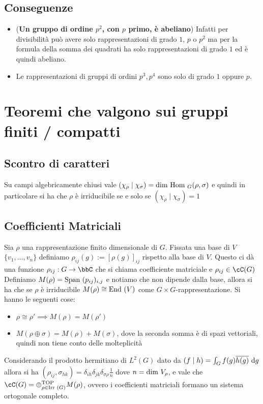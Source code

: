 \documentclass[a4paper,NoNotes,GeneralMath]{stdmdoc}
\newcommand{\Irr}{\text{Irr }}
\newcommand{\Hom}{\text{Hom }}
\begin{document}
	\subsection{Conseguenze}
	\begin{itemize}
		\item ({\bf Un gruppo di ordine $p^2$, con $p$ primo, è abeliano}) Infatti per divisibilità può avere solo rappresentazioni di grado $1$, $p$ o $p^2$ ma per la formula della somma dei quadrati ha solo rappresentazioni di grado $1$ ed è quindi abeliano.
		\item Le rappresentazioni di gruppi di ordini $p^3, p^4$ sono solo di grado $1$ oppure $p$.
	\end{itemize}


	\section{Teoremi che valgono sui gruppi finiti / compatti}
	\subsection{Scontro di caratteri}
	Su campi algebricamente chiusi vale $(\chi_\rho \mid \chi_\sigma) = \Dim \Hom_G (\rho, \sigma)$ e quindi in particolare si ha che $\rho$ è irriducibile se e solo se $(\chi_\rho \mid \chi_\sigma) = 1$
	
	\subsection{Coefficienti Matriciali}
	Sia $\rho$ una rappresentazione finito dimensionale di $G$. Fissata una base di $V$ $\{v_1, \ldots, v_n\}$ definiamo $\rho_{ij}(g) := [\rho(g)]_{ij}$ rispetto alla base di $V$. Questo ci dà una funzione $\rho_{ij}: G \rar \bbC$ che si chiama coefficiente matriciale e $\rho_{ij} \in \cC(G)$ \\
	Definiamo $M(\rho) = \mbox{Span }(p_{ij})_{i, j}$ e notiamo che non dipende dalla base, allora si ha che se $\rho$ è irriducibile $M(\rho) \cong \mbox{End }(V)$ come $G \times G$-rappresentazione. Si hanno le seguenti cose:
	\begin{itemize}
		\item $\rho \cong \rho' \implies M(\rho) = M(\rho')$
		\item $M(\rho \oplus \sigma) = M(\rho) + M(\sigma)$, dove la seconda somma è di spazi vettoriali, quindi non tiene conto delle molteplicità
	\end{itemize}
	Considerando il prodotto hermitiano di $L^2(G)$ dato da $(f \mid h) = \int_G f(g)\overline{h(g)} \de g$ allora si ha $(\rho_{ij}, \sigma_{hk}) = \delta_{ih} \delta_{jk} \delta_{\sigma\rho} \frac{1}{n}$ dove $n = \mbox{dim } V_\rho$, e vale che $\cC(G) = \oplus^{\text{TOP}}_{\rho \in \Irr(G)} M(\rho)$, ovvero i coefficienti matriciali formano un sistema ortogonale completo.
	
\end{document}
